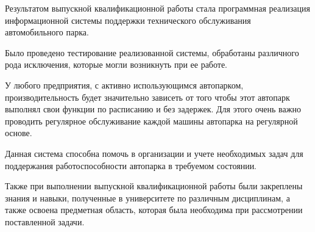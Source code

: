 Результатом выпускной квалификационной работы стала программная реализация
информационной системы поддержки технического обслуживания автомобильного парка.

Было проведено тестирование реализованной системы, обработаны различного рода
исключения, которые могли возникнуть при ее работе.

У любого предприятия, с активно использующимся автопарком, производительность
будет значительно зависеть от того чтобы этот автопарк выполнял свои функции по
расписанию и без задержек. Для этого очень важно проводить регулярное
обслуживание каждой машины автопарка на
регулярной основе.

Данная система способна помочь в организации и учете необходимых
задач для поддержания работоспособности автопарка в требуемом состоянии.

Также при выполнении выпускной квалификационной работы были закреплены знания и
навыки, полученные в университете по различным дисциплинам, а также освоена
предметная область, которая была необходима при рассмотрении поставленной
задачи.
